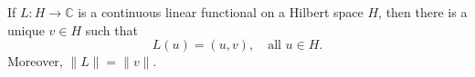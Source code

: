 If $L: H \to \mathbb{C}$ is a continuous linear functional on a Hilbert space $H$, then there is a unique $v \in H$ such that
$$L(u) = (u, v), \quad \text{all } u \in H.$$
Moreover, $\|L\| = \|v\|$.
